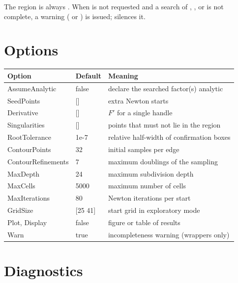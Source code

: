 The region is always . When  is not
requested and a search of , ,  or
 is not complete, a warning ( or
) is issued;  silences it.

\section{Options}

\begin{center}\small
\begin{tabularx}{\textwidth}{>{\ttfamily}p{3.6cm}p{1.6cm}X}
\toprule
\normalfont Option & Default & Meaning\\\midrule
AssumeAnalytic & false & declare the searched factor(s) analytic\\
SeedPoints & [] & extra Newton starts\\
Derivative & [] & $F'$ for a single handle\\
Singularities & [] & points that must not lie in the region\\
RootTolerance & 1e-7 & relative half-width of confirmation boxes\\
ContourPoints & 32 & initial samples per edge\\
ContourRefinements & 7 & maximum doublings of the sampling\\
MaxDepth & 24 & maximum subdivision depth\\
MaxCells & 5000 & maximum number of cells\\
MaxIterations & 80 & Newton iterations per start\\
GridSize & [25 41] & start grid in exploratory mode\\
Plot, Display & false & figure or table of results\\
Warn & true & incompleteness warning (wrappers only)\\
\bottomrule
\end{tabularx}\end{center}

\section{Diagnostics}

